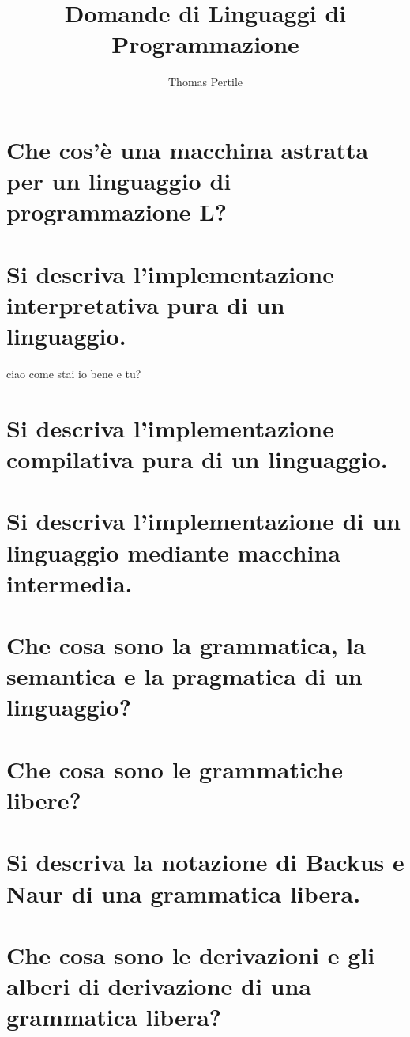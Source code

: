 \documentclass[a4paper, 10pt, italian]{article} %
\author{Thomas Pertile} %
\title{Domande di Linguaggi di Programmazione} %
\begin{document}
\maketitle %

\section{Che cos’\`{e} una macchina astratta per un linguaggio di programmazione L?} %

\section{Si descriva l’implementazione interpretativa pura di un linguaggio.}
ciao come stai io bene e tu?

\section{Si descriva l’implementazione compilativa pura di un linguaggio.}

\section{Si descriva l’implementazione di un linguaggio mediante macchina intermedia.}

\section{Che cosa sono la grammatica, la semantica e la pragmatica di un linguaggio?}

\section{Che cosa sono le grammatiche libere?}

\section{Si descriva la notazione di Backus e Naur di una grammatica libera.}

\section{Che cosa sono le derivazioni e gli alberi di derivazione di una grammatica libera?}
\end{document}
